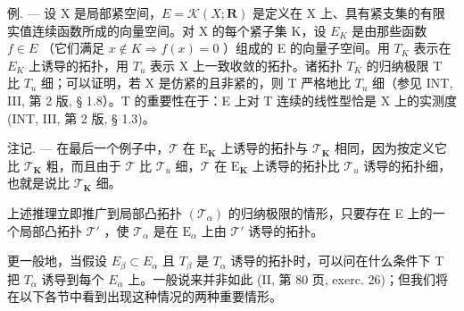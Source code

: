 例. --- 设 X 是局部紧空间，\(E = \mathcal{K}(X; \mathbf{R})\) 是定义在 X 上、具有紧支集的有限实值连续函数所成的向量空间。对 X 的每个紧子集 K，设 \(E_{K}\) 是由那些函数 \(f \in E\) （它们满足 \(x \notin K \Rightarrow f(x) = 0\) ）组成的 E 的向量子空间。用 \(T_{K}\) 表示在 \(E_{K}\) 上诱导的拓扑，用 \(T_{u}\) 表示 X 上一致收敛的拓扑。诸拓扑 \(T_{K}\) 的归纳极限 T 比 \(T_{u}\) 细；可以证明，若 X 是仿紧的且非紧的，则 T 严格地比 \(T_{u}\) 细（参见 INT, III, 第 2 版, § 1.8）。T 的重要性在于：E 上对 T 连续的线性型恰是 X 上的实测度 (INT, III, 第 2 版, § 1.3)。

注记. --- 在最后一个例子中，\(\mathcal{T}\) 在 \(\mathrm{E}_{\mathbf{K}}\) 上诱导的拓扑与 \(\mathcal{T}_{\mathbf{K}}\) 相同，因为按定义它比 \(\mathcal{T}_{\mathbf{K}}\) 粗，而且由于 \(\mathcal{T}\) 比 \(\mathcal{T}_{u}\) 细，\(\mathcal{T}\) 在 \(\mathrm{E}_{\mathbf{K}}\) 上诱导的拓扑比 \(\mathcal{T}_{u}\) 诱导的拓扑细，也就是说比 \(\mathcal{T}_{\mathbf{K}}\) 细。

上述推理立即推广到局部凸拓扑 \((\mathcal{T}_{\alpha})\) 的归纳极限的情形，只要存在 E 上的一个局部凸拓扑 \(\mathcal{T}'\) ，使 \(\mathcal{T}_{\alpha}\) 是在 \(\mathrm{E}_{\alpha}\) 上由 \(\mathcal{T}'\) 诱导的拓扑。

更一般地，当假设 \(E_{\beta} \subset E_{\alpha}\) 且 \(T_{\beta}\) 是 \(T_{\alpha}\) 诱导的拓扑时，可以问在什么条件下 T 把 \(T_{\alpha}\) 诱导到每个 \(E_{\alpha}\) 上。一般说来并非如此 (II, 第 80 页, exerc. 26)；但我们将在以下各节中看到出现这种情况的两种重要情形。


